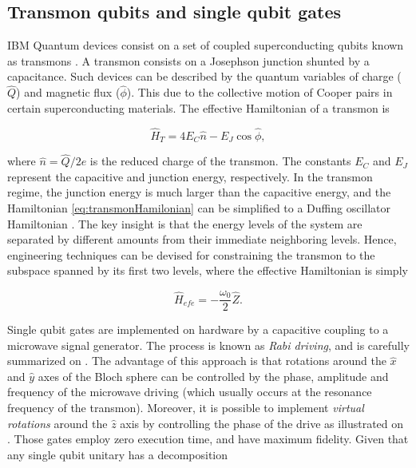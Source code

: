   \subsection{Transmon qubits and single qubit gates}
  \label{subsec:TransmonQubits}

    IBM Quantum devices consist on a set of coupled superconducting qubits known as transmons \cite{Qiskit, quantumEngineer}. A transmon consists on a Josephson junction shunted by a capacitance. Such devices can be described by the quantum variables of charge ($\hat{Q}$) and magnetic flux ($\hat{\phi}$). This due to the collective motion of Cooper pairs in certain superconducting materials. The effective Hamiltonian of a transmon is \cite{quantumEngineer}

    \begin{equation}
      \hat{H}_T = 4E_C \hat{n} - E_J \cos{\hat{\phi}},
      \label{eq:transmonHamilonian}
    \end{equation}

    \noindent where $\hat{n} = \hat{Q}/2e$ is the reduced charge of the transmon. The constants $E_C$ and $E_J$ represent the capacitive and junction energy, respectively. In the transmon regime, the junction energy is much larger than the capacitive energy, and the Hamiltonian \ref{eq:transmonHamilonian} can be simplified to a Duffing oscillator Hamiltonian \cite{quantumEngineer}. The key insight is that the energy levels of the system are separated by different amounts from their immediate neighboring levels. Hence, engineering techniques can be devised for constraining the transmon to the subspace spanned by its first two levels, where the effective Hamiltonian is simply

    \begin{equation}
      \hat{H}_{efe} = -\frac{\omega_0}{2} \hat{Z}.
      \label{eq:qubitHamiltonian}
    \end{equation}

    Single qubit gates are implemented on hardware by a capacitive coupling to a microwave signal generator. The process is known as \textit{Rabi driving}, and is carefully summarized on \cite{quantumEngineer}. The advantage of this approach is that rotations around the $\hat{x}$ and $\hat{y}$ axes of the Bloch sphere can be controlled by the phase, amplitude and frequency of the microwave driving (which usually occurs at the resonance frequency of the transmon). Moreover, it is possible to implement \textit{virtual rotations} around the $\hat{z}$ axis by controlling the phase of the drive as illustrated on \cite{quantumEngineer}. Those gates employ zero execution time, and have maximum fidelity. Given that any single qubit unitary has a decomposition

